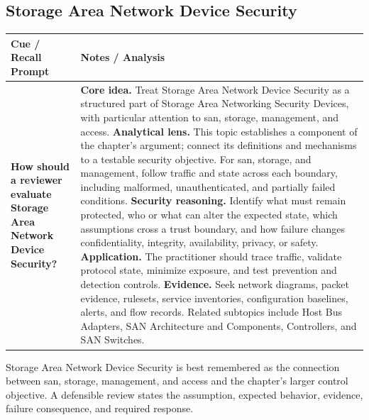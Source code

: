 \documentclass[11pt]{article}
\newcommand{\CornellHeader}{%
\rowcolor{Navy}\color{white}\bfseries Cue / Recall Prompt & \color{white}\bfseries Notes / Analysis\\\hline}
\newcommand{\CornellRow}[2]{%
\cellcolor{CueGray}\RaggedRight\textbf{#1} & \RaggedRight #2\\\hline}
\begin{document}
\subsection*{Storage Area Network Device Security}
\begin{longtable}{>{\RaggedRight\arraybackslash}p{}|>{\RaggedRight\arraybackslash}p{}}
\CornellHeader
\CornellRow{How should a reviewer evaluate Storage Area Network Device Security?}{\textbf{Core idea.} Treat Storage Area Network Device Security as a structured part of Storage Area Networking Security Devices, with particular attention to san, storage, management, and access. \textbf{Analytical lens.} This topic establishes a component of the chapter's argument; connect its definitions and mechanisms to a testable security objective. For san, storage, and management, follow traffic and state across each boundary, including malformed, unauthenticated, and partially failed conditions. \textbf{Security reasoning.} Identify what must remain protected, who or what can alter the expected state, which assumptions cross a trust boundary, and how failure changes confidentiality, integrity, availability, privacy, or safety. \textbf{Application.} The practitioner should trace traffic, validate protocol state, minimize exposure, and test prevention and detection controls. \textbf{Evidence.} Seek network diagrams, packet evidence, rulesets, service inventories, configuration baselines, alerts, and flow records. Related subtopics include Host Bus Adapters, SAN Architecture and Components, Controllers, and SAN Switches.}
\end{longtable}
\begin{topicsummary}
Storage Area Network Device Security is best remembered as the connection between san, storage, management, and access and the chapter's larger control objective. A defensible review states the assumption, expected behavior, evidence, failure consequence, and required response.
\end{topicsummary}
\end{document}
